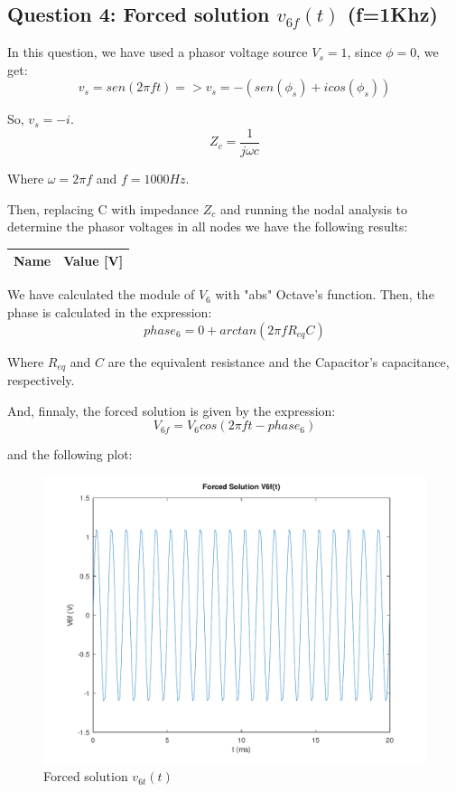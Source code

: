 \subsection{Question 4: Forced solution $v_{6f}(t)$ (f=1Khz)}
In this question, we have used a phasor voltage source $V_s = 1$, since $\phi = 0$, we get:
\begin{equation}
     v_s = sen(2\pi ft) => v_s = -(sen(\phi_s) + icos(\phi_s))
\end{equation}\par
So, $v_s=-i$.
\begin{equation}
     Z_c = \frac{1}{j\omega c}
\end{equation}\par
Where $\omega= 2\pi f$ and $f= 1000Hz$.\par

Then, replacing C with  impedance $Z_c$ and running the nodal analysis to determine the phasor voltages in all nodes we have the following results:\par

\begin{center}
  \begin{tabular}{ | c | c | }
    \hline    
    {\bf Name} & {\bf Value [V]} \\ \hline
    
    \hline
  \end{tabular}
\end{center}

We have calculated the module of $V_6$ with "abs" Octave's function. Then, the phase is calculated in the expression:
\begin{equation}
     phase_6 = 0 + arctan({2\pi f}{R_{eq}}{C})
\end{equation}\par

Where $R_{eq}$ and $C$ are the equivalent resistance and the Capacitor's capacitance, respectively.

And, finnaly, the forced solution is given by the expression:
\begin{equation}
     V_{6f}= V_6cos({2\pi f}{t} - phase_6)
\end{equation}\par
and the following plot:\par

\begin{figure}[H] \centering
\includegraphics[width=0.7\linewidth]{../mat/alinea4.pdf}
\caption{Forced solution $v_{6t}(t)$}
\label{fig:plot4}
\end{figure}

